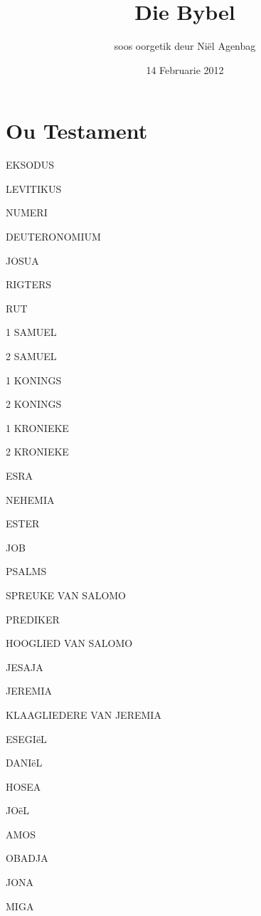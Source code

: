 \documentclass[twoside,twocolumn,letterpaper]{book}
\newcommand{\jnumChapters}{0}
\begin{document}
\frontmatter

\title{Die Bybel}
\date{14 Februarie 2012}
\author{soos oorgetik deur Ni\"el Agenbag}
\setlength{\columnseprule}{0pt}
\maketitle

\mainmatter

\part*{Ou Testament}
\setlength{\columnseprule}{0.0pt}
\renewcommand{\jnumChapters}{0}















EKSODUS

LEVITIKUS

NUMERI

DEUTERONOMIUM

JOSUA

RIGTERS

RUT

1 SAMUEL

2 SAMUEL

1 KONINGS

2 KONINGS

1 KRONIEKE

2 KRONIEKE

ESRA

NEHEMIA

ESTER

JOB

PSALMS

SPREUKE VAN SALOMO

PREDIKER

HOOGLIED VAN SALOMO

JESAJA

JEREMIA

KLAAGLIEDERE VAN JEREMIA

ESEGIëL

DANIëL

HOSEA

JOëL

AMOS

OBADJA

JONA

MIGA
\end{document}
